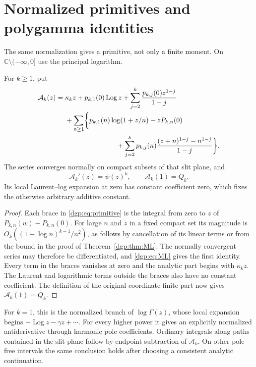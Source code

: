 \section{Normalized primitives and polygamma identities}
\label{dgp:sec:primitives}

The same normalization gives a primitive, not only a finite moment.
On $\mathbb{C}\setminus(-\infty,0]$ use the principal logarithm.

\begin{theorem}
\label{dgp:thm:primitive}
For $k\ge1$, put
\begin{align}
 \mathcal A_k(z)={}&\kappa_k z+p_{k,1}(0)\operatorname{Log} z
             +\sum_{j=2}^k\frac{p_{k,j}(0)z^{1-j}}{1-j}
 \notag\\
 &+\sum_{n\ge1}\biggl\{
       p_{k,1}(n)\log(1+z/n)-zP_{k,n}(0)
 \notag\\
 &\hspace{26mm}
       +\sum_{j=2}^k p_{k,j}(n)
             \frac{(z+n)^{1-j}-n^{1-j}}{1-j}\biggr\}.
 \label{dgp:eq:primitive}
\end{align}
The series converges normally on compact subsets of that slit plane,
and
\begin{equation}
             \mathcal A_k'(z)=\psi(z)^k,\qquad
             \mathcal A_k(1)=Q_k.
 \label{dgp:eq:primitive-properties}
\end{equation}
Its local Laurent--log expansion at zero has constant coefficient
zero, which fixes the otherwise arbitrary additive constant.
\end{theorem}

\begin{proof}
Each brace in \eqref{dgp:eq:primitive} is the integral from zero to $z$
of $P_{k,n}(w)-P_{k,n}(0)$.  For large $n$ and $z$ in a fixed
compact set its magnitude is
$O_k((1+\log n)^{k-1}/n^2)$, as follows by cancellation of its
linear terms or from the bound in the proof of Theorem~\ref{dgp:thm:ML}.
The normally convergent series may therefore be differentiated, and
\eqref{dgp:eq:ML} gives the first identity.  Every term in the braces
vanishes at zero and the analytic part begins with $\kappa_kz$.
The Laurent and logarithmic terms outside the braces also have no
constant coefficient.  The definition of the original-coordinate
finite part now gives $\mathcal A_k(1)=Q_k$.
\end{proof}

For $k=1$, this is the normalized branch of $\log\Gamma(z)$,
whose local expansion begins $-\operatorname{Log} z-\gamma z+\cdots$.
For every higher power it gives an explicitly normalized antiderivative
through harmonic pole coefficients.  Ordinary integrals along paths
contained in the slit plane follow by endpoint subtraction of
$\mathcal A_k$.  On other pole-free intervals the same conclusion
holds after choosing a consistent analytic continuation.

